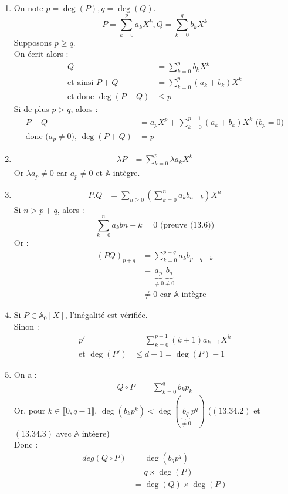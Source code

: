 \documentclass[../main.tex]{subfiles}
\begin{document}
\begin{enumerate}
    \item On note $p = \deg(P), q = \deg(Q)$. 
    $$P = \sum_{k=0}^{p} a_k X^k, Q = \sum_{k=0}^{q} b_k X^k$$
    Supposons $p \geq q$. \\
    On écrit alors : 
    \begin{align*}
        Q &= \sum_{k=0}^{p} b_k X^k \\
        \text{et ainsi } P+Q &= \sum_{k=0}^{p} (a_k + b_k) X^k \\
        \text{et donc } \deg(P+Q) &\leq p
    \end{align*}
    Si de plus $p > q$, alors : 
    \begin{align*}
        P + Q &= a_p X^p + \sum_{k=0}^{p-1} (a_k + b_k) X^k \text{ ($b_p = 0$)} \\
        \text{donc ($a_p \neq 0$), } \deg(P+Q) &= p
    \end{align*}

    \item \begin{align*}
        \lambda P &= \sum_{k=0}^{p} \lambda a_k X^k
    \end{align*}
    Or $\lambda a_p \neq 0$ car $a_p \neq 0$ et $\mathbb{A}$ intègre. 

    \item \begin{align*}
        P.Q &= \sum_{n \geq 0} \left( \sum_{k=0}^{n} a_k b_{n-k} \right) X^n
    \end{align*}
    Si $n > p+q$, alors : 
    $$\sum_{k=0}^{n} a_k b{n-k} = 0 \text{ (preuve (13.6))}$$
    Or : 
    \begin{align*}
        (PQ)_{p+q} &= \sum_{k=0}^{p+q} a_k b_{p+q-k} \\
        &= \underbrace{a_p}_{\neq 0} \underbrace{b_q}_{\neq 0} \\
        &\neq 0 \text{ car $\mathbb{A}$ intègre}
    \end{align*}

    \item Si $P \in \mathbb{A}_0[X]$, l'inégalité est vérifiée. \\
    Sinon : 
    \begin{align*}
        p' &= \sum_{k=0}^{p-1} (k+1) a_{k+1} X^k \\
        \text{et } \deg(P') &\leq d-1 = \deg(P) - 1
    \end{align*}

    \item On a :
    \begin{align*}
        Q \circ P &= \sum_{k=0}^{q} b_k p_k
    \end{align*}
    Or, pour $k \in \llbracket 0, q-1 \rrbracket$, $\deg(b_k p^k) < \deg(\underbrace{b_q}_{\neq 0} p^q)$ ($(\text{13.34.2})$ et $(\text{13.34.3})$ avec $\mathbb{A}$ intègre) \\
    Donc : 
    \begin{align*}
        deg(Q \circ P) &= \deg(b_q p^q) \\
        &= q \times \deg(P) \\
        &= \deg(Q) \times \deg(P)
    \end{align*}
\end{enumerate}
\end{document}
